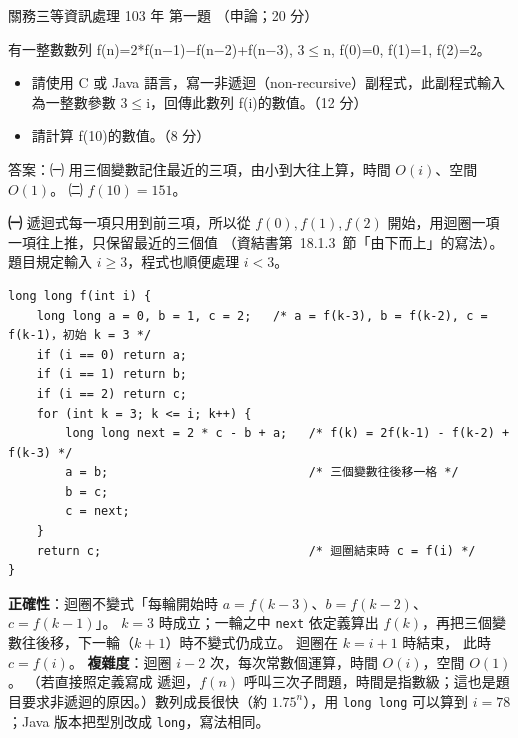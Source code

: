\begin{pastexam}[label={px:gw3-103-ds-01}]{關務三等資訊處理 103 年 第一題}
（申論；20 分）

有一整數數列 f(n)=2*f(n$-$1)$-$f(n$-$2)+f(n$-$3), 3$\le$n, f(0)=0, f(1)=1, f(2)=2。
\begin{itemize}[leftmargin=2.2em]
\item[㈠] 請使用 C 或 Java 語言，寫一非遞迴（non-recursive）副程式，此副程式輸入為一整數參數 3$\le$i，回傳此數列
f(i)的數值。（12 分）
\item[㈡] 請計算 f(10)的數值。（8 分）
\end{itemize}
\end{pastexam}

\begin{pastsoln}
答案：㈠ 用三個變數記住最近的三項，由小到大往上算，時間 $O(i)$、空間 $O(1)$。 ㈡ $f(10) = 151$。

\textbf{㈠} 遞迴式每一項只用到前三項，所以從 $f(0), f(1), f(2)$ 開始，用迴圈一項一項往上推，只保留最近的三個值
（資結書第~18.1.3~節「由下而上」的寫法）。 題目規定輸入 $i \ge 3$，程式也順便處理 $i < 3$。
\begin{verbatim}
long long f(int i) {
    long long a = 0, b = 1, c = 2;   /* a = f(k-3), b = f(k-2), c = f(k-1)，初始 k = 3 */
    if (i == 0) return a;
    if (i == 1) return b;
    if (i == 2) return c;
    for (int k = 3; k <= i; k++) {
        long long next = 2 * c - b + a;   /* f(k) = 2f(k-1) - f(k-2) + f(k-3) */
        a = b;                            /* 三個變數往後移一格 */
        b = c;
        c = next;
    }
    return c;                             /* 迴圈結束時 c = f(i) */
}
\end{verbatim}
\textbf{正確性}：迴圈不變式「每輪開始時 $a = f(k-3)$、$b = f(k-2)$、$c = f(k-1)$」。 $k = 3$ 時成立；一輪之中
\texttt{next} 依定義算出 $f(k)$，再把三個變數往後移，下一輪（$k + 1$）時不變式仍成立。 迴圈在 $k = i + 1$ 時結束，
此時 $c = f(i)$。 \textbf{複雜度}：迴圈 $i - 2$ 次，每次常數個運算，時間 $O(i)$，空間 $O(1)$。 （若直接照定義寫成
遞迴，$f(n)$ 呼叫三次子問題，時間是指數級；這也是題目要求非遞迴的原因。）數列成長很快（約 $1.75^n$），用
\texttt{long long} 可以算到 $i = 78$；Java 版本把型別改成 \texttt{long}，寫法相同。


\end{pastsoln}
